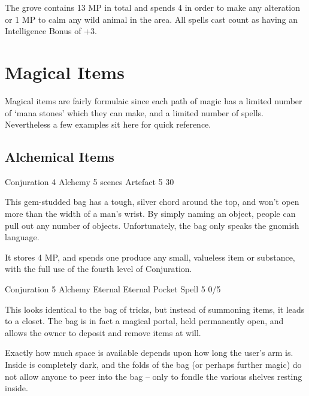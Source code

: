 \begin{multicols}{2}

The grove contains 13 MP in total and spends 4 in order to make any alteration or 1 MP to calm any wild animal in the area.
All spells cast count as having an Intelligence Bonus of +3.

\end{multicols}

\section{Magical Items}
\label{magicalitems}

\begin{multicols}{2}

\noindent
Magical items are fairly formulaic since each path of magic has a limited number of `mana stones' which they can make, and a limited number of spells.
Nevertheless a few examples sit here for quick reference.

\subsection{Alchemical Items}

	{Conjuration 4}%
	{Alchemy}%
	{5 scenes}%
	{Artefact}%
	{5}%
	{30}%

This gem-studded bag has a tough, silver chord around the top, and won't open more than the width of a man's wrist.
By simply naming an object, people can pull out any number of objects.
Unfortunately, the bag only speaks the gnomish language.

It stores 4 MP, and spends one produce any small, valueless item or substance, with the full use of the fourth level of Conjuration.

	{Conjuration 5}%
	{Alchemy}%
	{Eternal}%
	{Eternal Pocket Spell}%
	{5}%
	{0/5}%

This looks identical to the bag of tricks, but instead of summoning items, it leads to a closet.
The bag is in fact a magical portal, held permanently open, and allows the owner to deposit and remove items at will.

Exactly how much space is available depends upon how long the user's arm is.  Inside is completely dark, and the folds of the bag (or perhaps further magic) do not allow anyone to peer into the bag -- only to fondle the various shelves resting inside.


\end{multicols}
